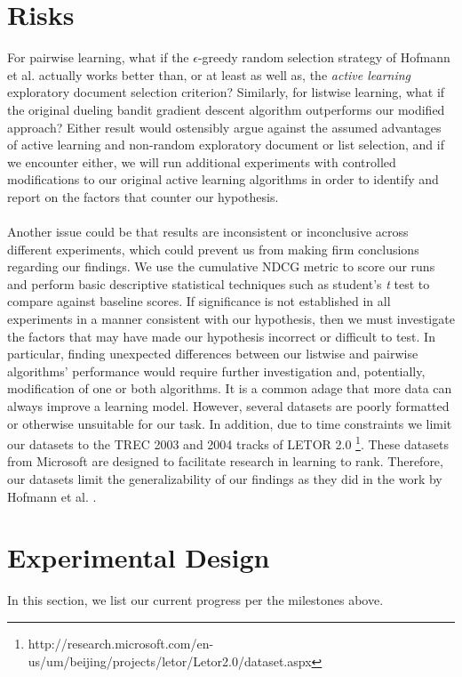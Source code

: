 \documentclass{acm_proc_article-sp}
\begin{document}
\section{Risks}
For pairwise learning, what if the $\epsilon$-greedy random selection strategy of Hofmann et al. \cite{hofmann} actually works better than, or at least as well as, the \emph{active learning} exploratory document selection criterion? Similarly, for listwise learning, what if the original dueling bandit gradient descent algorithm outperforms our modified approach? Either result would ostensibly argue against the assumed advantages of active learning and non-random exploratory document or list selection, and if we encounter either, we will run additional experiments with controlled modifications to our original active learning algorithms in order to identify and report on the factors that counter our hypothesis.\\ \\
Another issue could be that results are inconsistent or inconclusive across different experiments, which could prevent us from making firm conclusions regarding our findings. We use the cumulative NDCG metric to score our runs and perform basic descriptive statistical techniques such as student's \emph{t} test to compare against baseline scores. If significance is not established in all experiments in a manner consistent with our hypothesis, then we must investigate the factors that may have made our hypothesis incorrect or difficult to test. In particular, finding unexpected differences between our listwise and pairwise algorithms' performance would require further investigation and,  potentially, modification of one or both algorithms. It is a common adage that more data can always improve a learning model. However, several datasets are poorly formatted or otherwise unsuitable for our task. In addition, due to time constraints we limit our datasets to the TREC 2003 and 2004 tracks of LETOR 2.0 \footnote{http://research.microsoft.com/en-us/um/beijing/projects/letor/Letor2.0/dataset.aspx}. These datasets from Microsoft are designed to facilitate research in learning to rank. Therefore, our datasets limit the generalizability of our findings as they did in the work by Hofmann et al. \cite{hofmann}.

\section{Experimental Design}
In this section, we list our current progress per the milestones above. 
\end{document}
